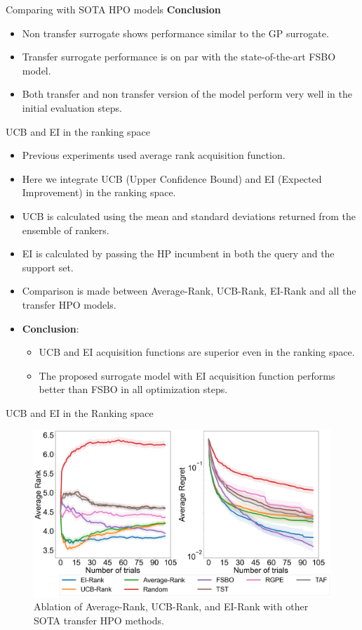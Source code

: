 \documentclass{beamer}
\begin{document}
\begin{frame}[t]{Comparing with SOTA HPO models}
\textbf{Conclusion}
\begin{itemize}
\item Non transfer surrogate shows performance similar to the GP surrogate.
\item Transfer surrogate performance is on par with the state-of-the-art FSBO model.
\item Both transfer and non transfer version of the model perform very well in the initial evaluation steps.
\end{itemize}
\end{frame}

\begin{frame}[t]{UCB and EI in the ranking space}
\begin{itemize}
\item Previous experiments used average rank acquisition function.
\item Here we integrate UCB (Upper Confidence Bound) and EI (Expected Improvement) in the ranking space.
\item UCB is calculated using the mean and standard deviations returned from the ensemble of rankers.
\item EI is calculated by passing the HP incumbent in both the query and the support set.
\item Comparison is made between Average-Rank,  UCB-Rank,  EI-Rank and all the transfer HPO models.
\item \textbf{Conclusion}:
\begin{itemize}
\item UCB and EI acquisition functions are superior even in the ranking space. \item The proposed surrogate model with EI  acquisition function performs better than FSBO in all optimization steps.
\end{itemize}
\end{itemize}
\end{frame}

\begin{frame}[t]{UCB and EI in the Ranking space}
\begin{figure}[h]
  \centering
    \includegraphics[scale=0.20]{images/acqusitionRanking}
    \caption{Ablation of Average-Rank, UCB-Rank, and EI-Rank with other SOTA transfer HPO methods.}
    \label{fig:acqusitionRanking}
\end{figure}

\end{frame}
\end{document}

